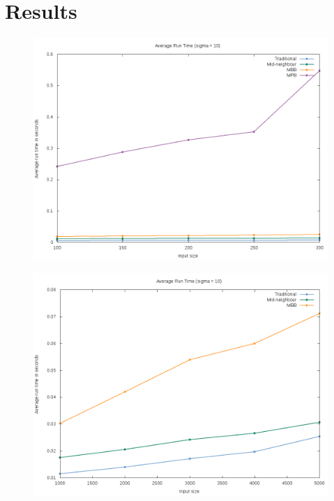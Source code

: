 \documentclass[12pt]{article}
\begin{document}
\section{Results}
\begin{figure}[H]
        \centering
        \includegraphics[scale=.5]{time_result_mpb}
\end{figure}
\begin{figure}[H]
        \centering
        \includegraphics[scale=.5]{time_result}
\end{figure}
\end{document}

